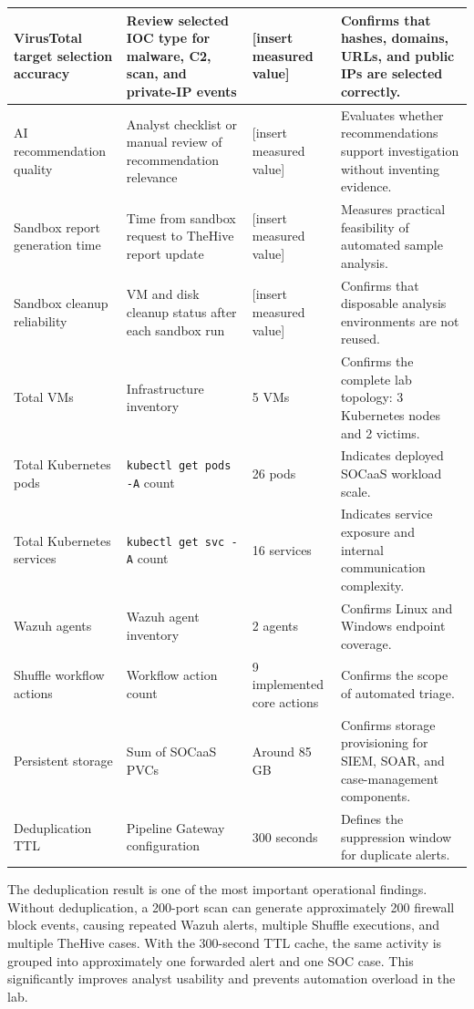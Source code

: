\begin{table}[H]
\begin{tabularx}{\textwidth}{|X|X|X|X|}
\hline
VirusTotal target selection accuracy & Review selected IOC type for malware, C2, scan, and private-IP events & [insert measured value] & Confirms that hashes, domains, URLs, and public IPs are selected correctly. \\
\hline
AI recommendation quality & Analyst checklist or manual review of recommendation relevance & [insert measured value] & Evaluates whether recommendations support investigation without inventing evidence. \\
\hline
Sandbox report generation time & Time from sandbox request to TheHive report update & [insert measured value] & Measures practical feasibility of automated sample analysis. \\
\hline
Sandbox cleanup reliability & VM and disk cleanup status after each sandbox run & [insert measured value] & Confirms that disposable analysis environments are not reused. \\
\hline
Total VMs & Infrastructure inventory & 5 VMs & Confirms the complete lab topology: 3 Kubernetes nodes and 2 victims. \\
\hline
Total Kubernetes pods & \texttt{kubectl get pods -A} count & 26 pods & Indicates deployed SOCaaS workload scale. \\
\hline
Total Kubernetes services & \texttt{kubectl get svc -A} count & 16 services & Indicates service exposure and internal communication complexity. \\
\hline
Wazuh agents & Wazuh agent inventory & 2 agents & Confirms Linux and Windows endpoint coverage. \\
\hline
Shuffle workflow actions & Workflow action count & 9 implemented core actions & Confirms the scope of automated triage. \\
\hline
Persistent storage & Sum of SOCaaS PVCs & Around 85 GB & Confirms storage provisioning for SIEM, SOAR, and case-management components. \\
\hline
Deduplication TTL & Pipeline Gateway configuration & 300 seconds & Defines the suppression window for duplicate alerts. \\
\hline
\end{tabularx}
\end{table}

The deduplication result is one of the most important operational findings. Without deduplication, a 200-port scan can generate approximately 200 firewall block events, causing repeated Wazuh alerts, multiple Shuffle executions, and multiple TheHive cases. With the 300-second TTL cache, the same activity is grouped into approximately one forwarded alert and one SOC case. This significantly improves analyst usability and prevents automation overload in the lab.

